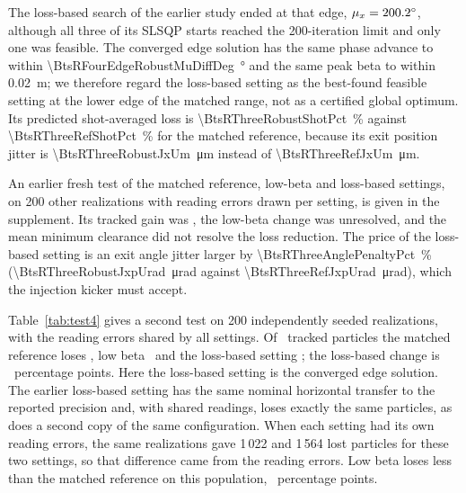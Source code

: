 \documentclass[final,5p,twocolumn]{elsarticle}
\begin{document}
The loss-based search of the earlier study ended at that edge,
$\mu_x=\SI{200.2}{\degree}$, although all three of its SLSQP starts reached the
200-iteration limit and only one was feasible. The converged edge solution has the
same phase advance to within \SI{\BtsRFourEdgeRobustMuDiffDeg}{\degree} and the same peak beta to within
\SI{0.02}{\metre}; we therefore regard the loss-based setting as the best-found feasible setting at
the lower edge of the matched range, not as a certified global optimum. Its predicted shot-averaged loss is \SI{\BtsRThreeRobustShotPct}{\percent}
against \SI{\BtsRThreeRefShotPct}{\percent} for the matched reference, because its exit position jitter is
\SI{\BtsRThreeRobustJxUm}{\micro\metre} instead of \SI{\BtsRThreeRefJxUm}{\micro\metre}.

An earlier fresh test of the matched reference, low-beta and loss-based settings, on
200 other realizations with reading errors drawn per setting, is given in the
supplement. Its tracked gain was \BtsRThreeLossRatio, the low-beta change was unresolved, and the
mean minimum clearance did not resolve the loss reduction. The price of the loss-based
setting is an exit angle jitter larger by \SI{\BtsRThreeAnglePenaltyPct}{\percent} (\SI{\BtsRThreeRobustJxpUrad}{\micro\radian} against
\SI{\BtsRThreeRefJxpUrad}{\micro\radian}), which the injection kicker must accept.

Table~\ref{tab:test4} gives a second test on 200 independently seeded realizations,
with the reading errors shared by all settings. Of \BtsRFiveParticles\ tracked particles the
matched reference loses \BtsRFiveLostRef, low beta \BtsRFiveLostLow\ and the loss-based setting
\BtsRFiveLostEdge; the loss-based change is \BtsRFiveDiffEdge\ percentage points. Here the
loss-based setting is the converged edge solution. The earlier loss-based setting has
the same nominal horizontal transfer to the reported precision and, with shared
readings, loses exactly the same particles, as does a second copy of the same
configuration. When each setting had its own reading errors, the same realizations gave
1\,022 and 1\,564 lost particles for these two settings, so that difference came from the
reading errors. Low beta loses less than the matched reference on this population,
\BtsRFiveDiffLow\ percentage points.
\end{document}
